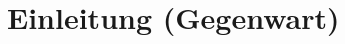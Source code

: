 %
%
\glsresetall %
\let\raggedsection\centering
\chapter{Einleitung (Gegenwart)}\label{chap.einleitung}
\let\raggedsection\raggedright 
